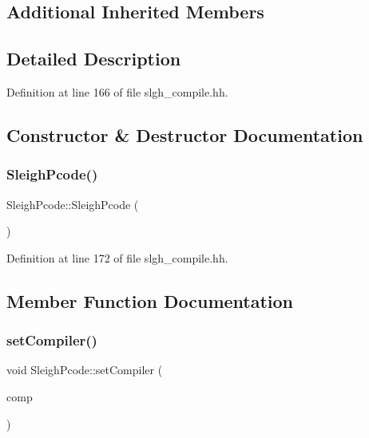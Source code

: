 \subsection*{Additional Inherited Members}


\subsection{Detailed Description}


Definition at line 166 of file slgh\+\_\+compile.\+hh.



\subsection{Constructor \& Destructor Documentation}
\mbox{\label{class_sleigh_pcode_a704c631f50f4a05a7ca7508732b6341f}} 
\subsubsection{\texorpdfstring{SleighPcode()}{SleighPcode()}}
{\footnotesize\ttfamily Sleigh\+Pcode\+::\+Sleigh\+Pcode (\begin{DoxyParamCaption}\item[{void}]{ }\end{DoxyParamCaption})\hspace{0.3cm}{\ttfamily [inline]}}



Definition at line 172 of file slgh\+\_\+compile.\+hh.



\subsection{Member Function Documentation}
\mbox{\label{class_sleigh_pcode_a885a81e5b9203ddfb7105c96ca97ef03}} 
\subsubsection{\texorpdfstring{setCompiler()}{setCompiler()}}
{\footnotesize\ttfamily void Sleigh\+Pcode\+::set\+Compiler (\begin{DoxyParamCaption}\item[{\mbox{\hyperlink{class_sleigh_compile}{Sleigh\+Compile}} $\ast$}]{comp }\end{DoxyParamCaption})\hspace{0.3cm}{\ttfamily [inline]}}



